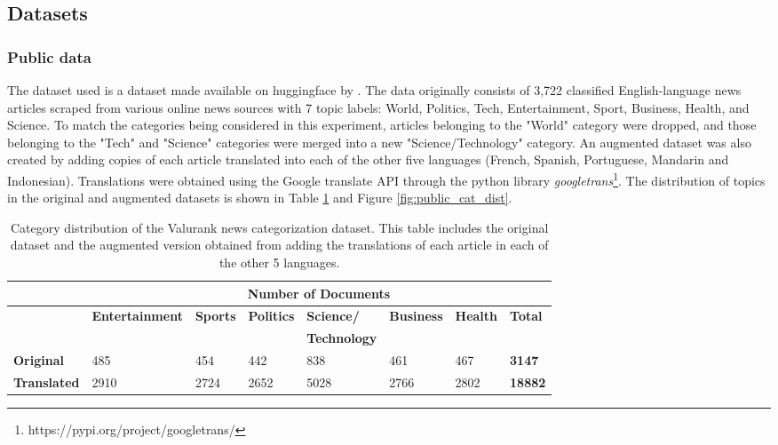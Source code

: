 \documentclass{l4proj}
\begin{document}
\subsection{Datasets}
\subsubsection{Public data} \hfill \par
The dataset used is a dataset made available on huggingface by \cite{valurankdata}. The data originally consists of 3,722 classified English-language news articles scraped from various online news sources with 7 topic labels: World, Politics, Tech, Entertainment, Sport, Business, Health, and Science. To match the categories being considered in this experiment, articles belonging to the "World" category were dropped, and those belonging to the "Tech" and "Science" categories were merged into a new "Science/Technology" category. An augmented dataset was also created by adding copies of each article translated into each of the other five languages (French, Spanish, Portuguese, Mandarin and Indonesian). Translations were obtained using the Google translate API through the python library \emph{googletrans}\footnote{https://pypi.org/project/googletrans/}. The distribution of topics in the original and augmented datasets is shown in Table \ref{table:valurankstats} and Figure \ref{fig:public_cat_dist}.

\begin{table}[]
\begin{tabular}{llllllll}
\hline
\multicolumn{1}{c}{\textbf{}} & \multicolumn{7}{c}{\textbf{Number of Documents}}                                                                                          \\ \hline
                              & \textbf{Entertainment} & \textbf{Sports} & \textbf{Politics} & \textbf{Science/}   & \textbf{Business} & \textbf{Health} & \textbf{Total} \\
                              & \textbf{}              &                 &                   & \textbf{Technology} & \textbf{}         & \textbf{}       &                \\ \hline
\textbf{Original}             & 485                    & 454             & 442               & 838                 & 461               & 467             & \textbf{3147}  \\
\textbf{Translated}           & 2910                   & 2724            & 2652              & 5028                & 2766              & 2802            & \textbf{18882} \\ \hline
\end{tabular}
\caption{Category distribution of the Valurank news categorization dataset. This table includes the original dataset and the augmented version obtained from adding the translations of each article in each of the other 5 languages.}
\label{table:valurankstats}
\end{table}
\end{document}
